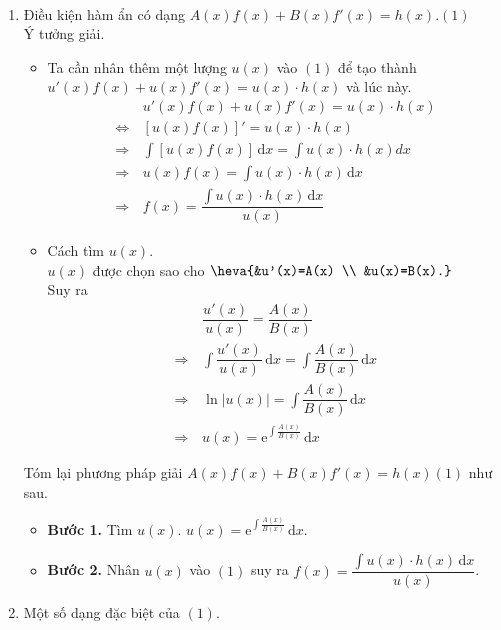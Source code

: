 \begin{dang}{~}
	\begin{enumerate}[1]
		\item Điều kiện hàm ẩn có dạng $A(x)f(x)+B(x)f'(x)=h(x)$.\quad $(1)$\\
		Ý tưởng giải.
		\begin{itemize}
			\item Ta cần nhân thêm một lượng $u(x)$ vào  $(1)$ để tạo thành \break $u'(x) f(x)+u(x) f'(x)=u(x) \cdot h(x)$ và lúc này.
			\begin{align*}
				&\, u'(x) f(x)+u(x) f'(x)=u(x) \cdot h(x) \\
				\Leftrightarrow&\,\left[u(x) f(x)\right]'=u(x) \cdot h(x) \\
				\Rightarrow&\, \displaystyle\int\left[u(x) f(x)\right] \mathrm{\,d} x=\displaystyle\int u(x) \cdot h(x) d x \\
				\Rightarrow&\, u(x) f(x)=\displaystyle\int u(x) \cdot h(x) \mathrm{\,d} x \\
				\Rightarrow&\, f(x)=\dfrac{\displaystyle\int u(x) \cdot h(x) \mathrm{\,d} x}{u(x)}
			\end{align*}
			\item Cách tìm $u(x)$.\\
			$u(x)$ được chọn sao cho  $\heva{&u'(x)=A(x) \\ &u(x)=B(x).}$\\
			Suy ra 
			\begin{align*}
				&\,\dfrac{u'(x)}{u(x)}=\dfrac{A(x)}{B(x)}\\
				\Rightarrow&\, \displaystyle\int \dfrac{u'(x)}{u(x)} \mathrm{\,d} x=\displaystyle\int \dfrac{A(x)}{B(x)} \mathrm{\,d} x\\
				\Rightarrow&\, \ln |u(x)|=\displaystyle\int \dfrac{A(x)}{B(x)} \mathrm{\,d} x\\
				\Rightarrow&\, u(x)=\mathrm{e}^{\displaystyle\int\tfrac{A(x)}{B(x)}} \mathrm{\,d} x
			\end{align*}
		\end{itemize}
		Tóm lại phương pháp giải $A(x)f(x)+B(x)f'(x)=h(x)$\quad $(1)$ như sau.
		\begin{itemize}
			\item \textbf{Bước 1.} Tìm $u(x)$. $u(x)=\mathrm{e}^{\displaystyle\int\tfrac{A(x)}{B(x)}} \mathrm{\,d} x$.
			\item \textbf{Bước 2.} Nhân $u(x)$ vào $(1)$ suy ra $f(x)=\dfrac{\displaystyle\int\limits u(x) \cdot h(x) \mathrm{\,d}x}{u(x)}$.
		\end{itemize}
		\item Một số dạng đặc biệt của $(1)$.

\end{enumerate}
\end{dang}
